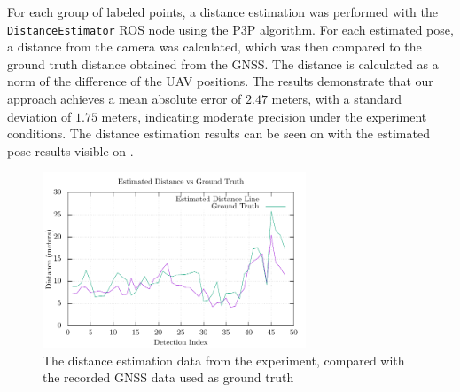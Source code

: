 For each group of labeled points, a distance estimation was performed with the \texttt{DistanceEstimator} ROS node using the
\ac{P3P} algorithm. For each estimated pose, a distance from the camera was calculated, which was then compared to the
ground truth distance obtained from the \ac{GNSS}. The distance is calculated as a norm of the difference of the \ac{UAV} positions.
The results demonstrate that our approach achieves a mean absolute error of $2.47$ meters, with a standard deviation of $1.75$ meters,
indicating moderate precision under the experiment conditions.
The distance estimation
results can be seen on  with the estimated pose results visible on .

\begin{figure}[H]
	\centering
	\includegraphics[width=0.7\textwidth]{./fig/tikz/experiment_analysis.pdf}
	\caption{The distance estimation data from the experiment, compared with the recorded GNSS data used as ground truth}
	\label{fig:experiment_results}
\end{figure}

